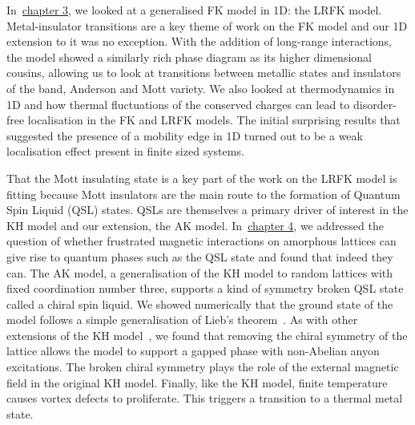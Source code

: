 In~\protect\hyperlink{chap:3-the-long-range-falicov-kimball-model}{chapter 3}, we looked at a generalised FK model in 1D: the LRFK model. Metal-insulator transitions are a key theme of work on the FK model and our 1D extension to it was no exception. With the addition of long-range interactions, the model showed a similarly rich phase diagram as its higher dimensional cousins, allowing us to look at transitions between metallic states and insulators of the band, Anderson and Mott variety. We also looked at thermodynamics in 1D and how thermal fluctuations of the conserved charges can lead to disorder-free localisation in the FK and LRFK models. The initial surprising results that suggested the presence of a mobility edge in 1D turned out to be a weak localisation effect present in finite sized systems.

That the Mott insulating state is a key part of the work on the LRFK model is fitting because Mott insulators are the main route to the formation of Quantum Spin Liquid (QSL) states. QSLs are themselves a primary driver of interest in the KH model and our extension, the AK model. In~\protect\hyperlink{chap:4-the-amorphous-kitaev-model}{chapter 4}, we addressed the question of whether frustrated magnetic interactions on amorphous lattices can give rise to quantum phases such as the QSL state and found that indeed they can. The AK model, a generalisation of the KH model to random lattices with fixed coordination number three, supports a kind of symmetry broken QSL state called a chiral spin liquid. We showed numerically that the ground state of the model follows a simple generalisation of Lieb's theorem~\autocite{lieb_flux_1994,OBrienPRB2016,eschmannThermodynamicClassificationThreedimensional2020}. As with other extensions of the KH model~\autocite{yaoExactChiralSpin2007}, we found that removing the chiral symmetry of the lattice allows the model to support a gapped phase with non-Abelian anyon excitations. The broken chiral symmetry plays the role of the external magnetic field in the original KH model. Finally, like the KH model, finite temperature causes vortex defects to proliferate. This triggers a transition to a thermal metal state.

